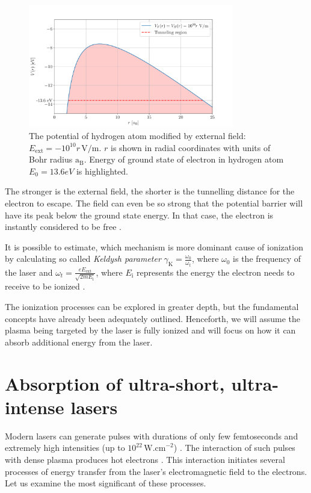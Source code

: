 \begin{figure}[h]
	\centering
	\includegraphics[width=0.8\textwidth]{figures/tunnelling}
	\caption{The potential of hydrogen atom modified by external field: $E_{\mathrm{ext}} = -10^{10}r\,\mathrm{V/m}$. $r$ is shown in radial coordinates with units of Bohr radius $\mathrm{a_B}$. Energy of ground state of electron in hydrogen atom $E_0 = 13.6 eV$ is highlighted.}
	\label{fig:tunnelling}
\end{figure}

The stronger is the external field, the shorter is the tunnelling distance for the electron to escape. The field can even be so strong that the potential barrier will have its peak below the ground state energy. In that case, the electron is instantly considered to be free \cite{laser-plasma1}. 

It is possible to estimate, which mechanism is more dominant cause of ionization by calculating so called \textit{Keldysh parameter} $\gamma_\mathrm{K} = \frac{\omega_0}{\omega_t}$, where $\omega_0$ is the frequency of the laser and $\omega_t = \frac{eE_{\mathrm{ext}}}{\sqrt{2mE_\mathrm{i}}}$, where $E_\mathrm{i}$ represents the energy the electron needs to receive to be ionized \cite{laser-plasma1}.

The ionization processes can be explored in greater depth, but the fundamental concepts have already been adequately outlined. Henceforth, we will assume the plasma being targeted by the laser is fully ionized and will focus on how it can absorb additional energy from the laser.

\section{Absorption of ultra-short, ultra-intense lasers}
Modern lasers can generate pulses with durations of only few femtoseconds and extremely high intensities (up to 
$10^{22}\,\mathrm{W.cm}^{-2}$) \cite{absorption2,ultra-laser}. The interaction of such pulses with dense plasma produces hot electrons \cite{laser-plasma5}. This interaction initiates several processes of energy transfer from the laser's electromagnetic field to the electrons. Let us examine the most significant of these processes.

